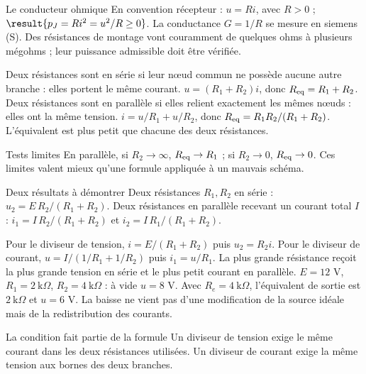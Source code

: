 \begin{loi}{Le conducteur ohmique}
En convention récepteur : $u=Ri$, avec $R>0$ ; $\result{p_J=Ri^2=u^2/R\geq0}$. La conductance $G=1/R$ se mesure en siemens (S). Des résistances de montage vont couramment de quelques ohms à plusieurs mégohms ; leur puissance admissible doit être vérifiée.
\end{loi}
Deux résistances sont en série si leur nœud commun ne possède aucune autre branche : elles portent le même courant. $u=(R_1+R_2)i$, donc $R_{\rm eq}=R_1+R_2$.
Deux résistances sont en parallèle si elles relient exactement les mêmes nœuds : elles ont la même tension. $i=u/R_1+u/R_2$, donc $R_{\rm eq}=R_1R_2/(R_1+R_2)$. L’équivalent est plus petit que chacune des deux résistances.
\begin{methode}{Tests limites}
En parallèle, si $R_2\to\infty$, $R_{\rm eq}\to R_1$ ; si $R_2\to0$, $R_{\rm eq}\to0$. Ces limites valent mieux qu’une formule appliquée à un mauvais schéma.
\end{methode}


\begin{loi}{Deux résultats à démontrer}
Deux résistances $R_1,R_2$ en série : $u_2=E\,R_2/(R_1+R_2)$. Deux résistances en parallèle recevant un courant total $I$ : $i_1=I\,R_2/(R_1+R_2)$ et $i_2=I\,R_1/(R_1+R_2)$.
\end{loi}
Pour le diviseur de tension, $i=E/(R_1+R_2)$ puis $u_2=R_2i$. Pour le diviseur de courant, $u=I/(1/R_1+1/R_2)$ puis $i_1=u/R_1$. La plus grande résistance reçoit la plus grande tension en série et le plus petit courant en parallèle.
$E=12$ V, $R_1=2\ \mathrm{k}\Omega$, $R_2=4\ \mathrm{k}\Omega$ : à vide $u=8$ V. Avec $R_e=4\ \mathrm{k}\Omega$, l’équivalent de sortie est $2\ \mathrm{k}\Omega$ et $u=6$ V. La baisse ne vient pas d’une modification de la source idéale mais de la redistribution des courants.
\begin{piege}{La condition fait partie de la formule}
Un diviseur de tension exige le même courant dans les deux résistances utilisées. Un diviseur de courant exige la même tension aux bornes des deux branches.
\end{piege}


